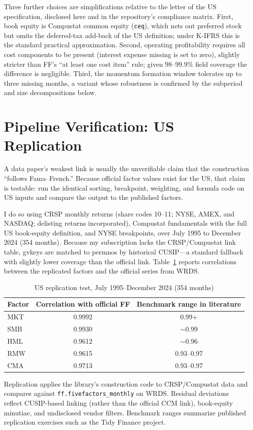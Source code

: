 \documentclass[11pt]{article}
\begin{document}
Three further choices are simplifications relative to the letter of the US specification, disclosed here and in the repository's compliance matrix. First, book equity is Compustat common equity (\texttt{ceq}), which nets out preferred stock but omits the deferred-tax add-back of the US definition; under K-IFRS this is the standard practical approximation. Second, operating profitability requires all cost components to be present (interest expense missing is set to zero), slightly stricter than FF's ``at least one cost item'' rule; given 98--99.9\% field coverage the difference is negligible. Third, the momentum formation window tolerates up to three missing months, a variant whose robustness is confirmed by the subperiod and size decompositions below.

\section{Pipeline Verification: US Replication}\label{sec:verification}

A data paper's weakest link is usually the unverifiable claim that the construction ``follows Fama--French.'' Because official factor values exist for the US, that claim is testable: run the identical sorting, breakpoint, weighting, and formula code on US inputs and compare the output to the published factors.

I do so using CRSP monthly returns (share codes 10--11; NYSE, AMEX, and NASDAQ; delisting returns incorporated), Compustat fundamentals with the full US book-equity definition, and NYSE breakpoints, over July 1995 to December 2024 (354 months). Because my subscription lacks the CRSP/Compustat link table, gvkeys are matched to permnos by historical CUSIP---a standard fallback with slightly lower coverage than the official link. Table~\ref{tab:replication} reports correlations between the replicated factors and the official series from WRDS.

\begin{table}[ht]
\centering
\caption{US replication test, July 1995--December 2024 (354 months)}
\label{tab:replication}
\begin{tabular}{lcc}
\toprule
Factor & Correlation with official FF & Benchmark range in literature \\
\midrule
MKT & 0.9992 & 0.99+ \\
SMB & 0.9930 & $\sim$0.99 \\
HML & 0.9612 & $\sim$0.96 \\
RMW & 0.9615 & 0.93--0.97 \\
CMA & 0.9713 & 0.93--0.97 \\
\bottomrule
\end{tabular}

\vspace{0.4em}
\parbox{0.9\textwidth}{\footnotesize Replication applies the library's construction code to CRSP/Compustat data and compares against \texttt{ff.fivefactors\_monthly} on WRDS. Residual deviations reflect CUSIP-based linking (rather than the official CCM link), book-equity minutiae, and undisclosed vendor filters. Benchmark ranges summarize published replication exercises such as the Tidy Finance project.}
\end{table}
\end{document}

